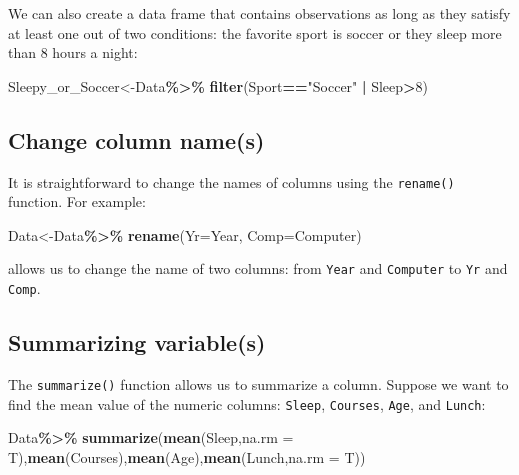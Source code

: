 \documentclass[
]{book}
\newenvironment{Shaded}{\begin{snugshade}}{\end{snugshade}}
\newcommand{\AttributeTok}[1]{\textcolor[rgb]{0.13,0.29,0.53}{#1}}
\newcommand{\DecValTok}[1]{\textcolor[rgb]{0.00,0.00,0.81}{#1}}
\newcommand{\FunctionTok}[1]{\textcolor[rgb]{0.13,0.29,0.53}{\textbf{#1}}}
\newcommand{\NormalTok}[1]{#1}
\newcommand{\OtherTok}[1]{\textcolor[rgb]{0.56,0.35,0.01}{#1}}
\newcommand{\SpecialCharTok}[1]{\textcolor[rgb]{0.81,0.36,0.00}{\textbf{#1}}}
\newcommand{\StringTok}[1]{\textcolor[rgb]{0.31,0.60,0.02}{#1}}
\begin{document}
We can also create a data frame that contains observations as long as they satisfy at least one out of two conditions: the favorite sport is soccer or they sleep more than 8 hours a night:

\begin{Shaded}
\begin{Highlighting}[]
\NormalTok{Sleepy\_or\_Soccer}\OtherTok{\textless{}{-}}\NormalTok{Data}\SpecialCharTok{\%\textgreater{}\%}
  \FunctionTok{filter}\NormalTok{(Sport}\SpecialCharTok{==}\StringTok{"Soccer"} \SpecialCharTok{|}\NormalTok{ Sleep}\SpecialCharTok{\textgreater{}}\DecValTok{8}\NormalTok{)}
\end{Highlighting}
\end{Shaded}

\hypertarget{change-column-names-1}{%
\subsection{Change column name(s)}\label{change-column-names-1}}

It is straightforward to change the names of columns using the \texttt{rename()} function. For example:

\begin{Shaded}
\begin{Highlighting}[]
\NormalTok{Data}\OtherTok{\textless{}{-}}\NormalTok{Data}\SpecialCharTok{\%\textgreater{}\%}
  \FunctionTok{rename}\NormalTok{(}\AttributeTok{Yr=}\NormalTok{Year, }\AttributeTok{Comp=}\NormalTok{Computer)}
\end{Highlighting}
\end{Shaded}

allows us to change the name of two columns: from \texttt{Year} and \texttt{Computer} to \texttt{Yr} and \texttt{Comp}.

\hypertarget{summarizing-variables-1}{%
\subsection{Summarizing variable(s)}\label{summarizing-variables-1}}

The \texttt{summarize()} function allows us to summarize a column. Suppose we want to find the mean value of the numeric columns: \texttt{Sleep}, \texttt{Courses}, \texttt{Age}, and \texttt{Lunch}:

\begin{Shaded}
\begin{Highlighting}[]
\NormalTok{Data}\SpecialCharTok{\%\textgreater{}\%}
  \FunctionTok{summarize}\NormalTok{(}\FunctionTok{mean}\NormalTok{(Sleep,}\AttributeTok{na.rm =}\NormalTok{ T),}\FunctionTok{mean}\NormalTok{(Courses),}\FunctionTok{mean}\NormalTok{(Age),}\FunctionTok{mean}\NormalTok{(Lunch,}\AttributeTok{na.rm =}\NormalTok{ T))}
\end{Highlighting}
\end{Shaded}
\end{document}
